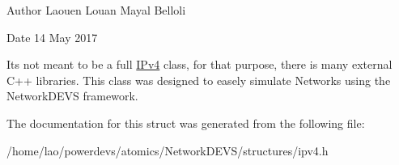 \begin{DoxyAuthor}{Author}
Laouen Louan Mayal Belloli 
\end{DoxyAuthor}
\begin{DoxyDate}{Date}
14 May 2017
\end{DoxyDate}
It\textquotesingle{}s not meant to be a full \hyperlink{structIPv4}{I\+Pv4} class, for that purpose, there is many external C++ libraries. This class was designed to easely simulate Networks using the Network\+D\+E\+VS framework. 

The documentation for this struct was generated from the following file\+:\begin{DoxyCompactItemize}
\item 
/home/lao/powerdevs/atomics/\+Network\+D\+E\+V\+S/structures/ipv4.\+h\end{DoxyCompactItemize}
